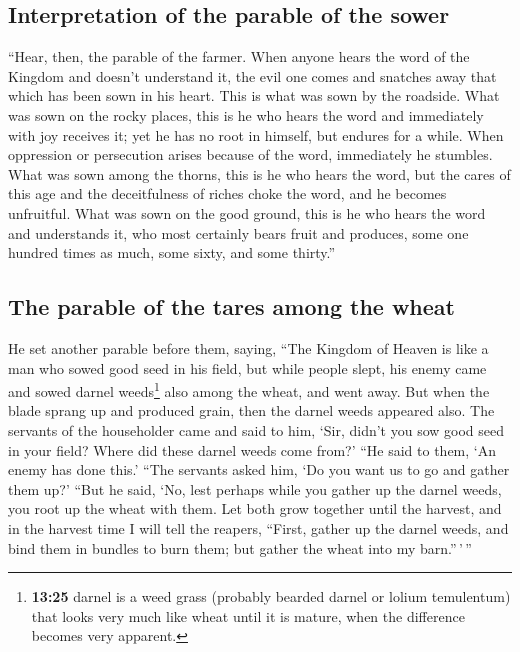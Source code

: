 \hypertarget{interpretation-of-the-parable-of-the-sower}{%
\subsection{Interpretation of the parable of the
sower}\label{interpretation-of-the-parable-of-the-sower}}

 ``Hear, then, the parable of the farmer. 
When anyone hears the word of the Kingdom and doesn't understand it, the
evil one comes and snatches away that which has been sown in his heart.
This is what was sown by the roadside.  What was sown on
the rocky places, this is he who hears the word and immediately with joy
receives it;  yet he has no root in himself, but endures
for a while. When oppression or persecution arises because of the word,
immediately he stumbles.  What was sown among the thorns,
this is he who hears the word, but the cares of this age and the
deceitfulness of riches choke the word, and he becomes unfruitful.
 What was sown on the good ground, this is he who hears
the word and understands it, who most certainly bears fruit and
produces, some one hundred times as much, some sixty, and some thirty.''

\hypertarget{the-parable-of-the-tares-among-the-wheat}{%
\subsection{The parable of the tares among the
wheat}\label{the-parable-of-the-tares-among-the-wheat}}

 He set another parable before them, saying, ``The
Kingdom of Heaven is like a man who sowed good seed in his field,
 but while people slept, his enemy came and sowed darnel
weeds\footnote{\textbf{13:25} darnel is a weed grass (probably bearded
  darnel or lolium temulentum) that looks very much like wheat until it
  is mature, when the difference becomes very apparent.} also among the
wheat, and went away.  But when the blade sprang up and
produced grain, then the darnel weeds appeared also.  The
servants of the householder came and said to him, `Sir, didn't you sow
good seed in your field? Where did these darnel weeds come from?'
 ``He said to them, `An enemy has done this.' ``The
servants asked him, `Do you want us to go and gather them up?'
 ``But he said, `No, lest perhaps while you gather up the
darnel weeds, you root up the wheat with them.  Let both
grow together until the harvest, and in the harvest time I will tell the
reapers, ``First, gather up the darnel weeds, and bind them in bundles
to burn them; but gather the wheat into my barn.''\,'\,''

